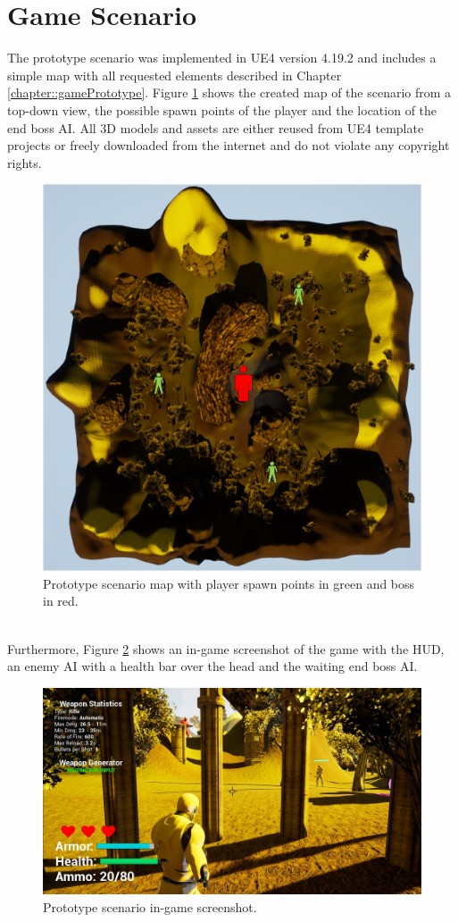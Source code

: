\documentclass[MGS,Master,english]{twbook}%
\begin{document}
\section{Game Scenario}
The prototype scenario was implemented in UE4 version 4.19.2 and includes a simple map with all requested elements described in Chapter \ref{chapter::gamePrototype}. Figure \ref{scenarioMap} shows the created map of the scenario from a top-down view, the possible spawn points of the player and the location of the end boss AI. All 3D models and assets are either reused from UE4 template projects or freely downloaded from the internet and do not violate any copyright rights.
\begin{figure}[!ht]
	\centering
	\includegraphics[width=0.6\linewidth]{PICs/Prototype/map_with_spawnpoints_and_boss}
	\caption{Prototype scenario map with player spawn points in green and boss in red.} \label{scenarioMap}
\end{figure}\\
Furthermore, Figure \ref{scenarioScreenshot} shows an in-game screenshot of the game with the HUD, an enemy AI with a health bar over the head and the waiting end boss AI.
\begin{figure}[!ht]
	\centering
	\includegraphics[width=1.0\linewidth]{PICs/Prototype/ingame_screenshot_small}
	\caption{Prototype scenario in-game screenshot.} \label{scenarioScreenshot}
\end{figure}
\end{document}
